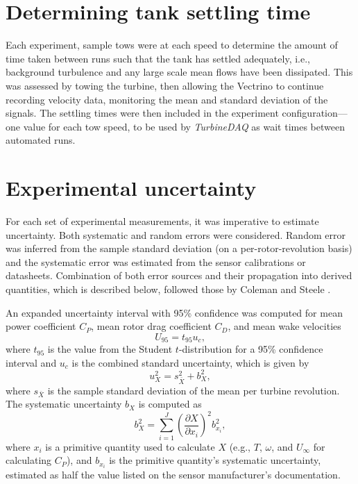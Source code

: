 \section{Determining tank settling time}

Each experiment, sample tows were at each speed to determine the amount of time
taken between runs such that the tank has settled adequately, i.e., background
turbulence and any large scale mean flows have been dissipated. This was
assessed by towing the turbine, then allowing the Vectrino to continue recording
velocity data, monitoring the mean and standard deviation of the signals. The
settling times were then included in the experiment configuration---one value
for each tow speed, to be used by \textit{TurbineDAQ} as wait times between
automated runs.



\section{Experimental uncertainty}


For each set of experimental measurements, it was imperative to estimate
uncertainty. Both systematic and random errors were considered. Random error was
inferred from the sample standard deviation (on a per-rotor-revolution basis)
and the systematic error was estimated from the sensor calibrations or
datasheets. Combination of both error sources and their propagation into derived
quantities, which is described below, followed those by Coleman and Steele
\cite{ColemanSteele}.

An expanded uncertainty interval with 95\% confidence was computed for mean
power coefficient $C_P$, mean rotor drag coefficient $C_D$, and mean wake
velocities
\begin{equation}
    U_{95} = t_{95} u_c,
\end{equation}
where $t_{95}$ is the value from the Student $t$-distribution for a 95\%
confidence interval and $u_c$ is the combined standard uncertainty, which is
given by
\begin{equation}
    u_X^2 = s_{\bar{X}}^2 + b_X^2,
\end{equation}
where $s_{\bar{X}}$ is the sample standard deviation of the mean per turbine
revolution. The systematic uncertainty $b_X$ is computed as
\begin{equation}
    b_{X}^2 = \sum_{i=1}^J \left( \frac{\partial X}{\partial x_i} \right)^2
    b_{x_i}^2,
\end{equation}
where $x_i$ is a primitive quantity used to calculate $X$ (e.g., $T$, $\omega$,
and $U_\infty$ for calculating $C_P$), and $b_{x_i}$ is the primitive quantity's
systematic uncertainty, estimated as half the value listed on the sensor
manufacturer's documentation.

